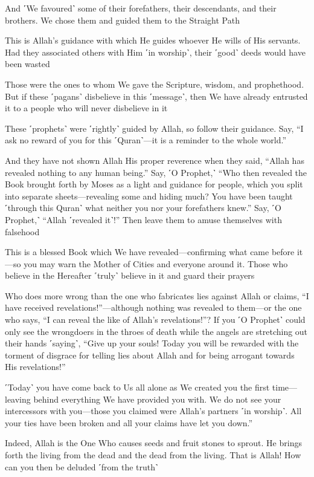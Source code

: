 And ˹We favoured˺ some of their forefathers, their descendants, and their brothers. We chose them and guided them to the Straight Path

This is Allah’s guidance with which He guides whoever He wills of His servants. Had they associated others with Him ˹in worship˺, their ˹good˺ deeds would have been wasted

Those were the ones to whom We gave the Scripture, wisdom, and prophethood. But if these ˹pagans˺ disbelieve in this ˹message˺, then We have already entrusted it to a people who will never disbelieve in it

These ˹prophets˺ were ˹rightly˺ guided by Allah, so follow their guidance. Say, “I ask no reward of you for this ˹Quran˺—it is a reminder to the whole world.”

And they have not shown Allah His proper reverence when they said, “Allah has revealed nothing to any human being.” Say, ˹O Prophet,˺ “Who then revealed the Book brought forth by Moses as a light and guidance for people, which you split into separate sheets—revealing some and hiding much? You have been taught ˹through this Quran˺ what neither you nor your forefathers knew.” Say, ˹O Prophet,˺ “Allah ˹revealed it˺!” Then leave them to amuse themselves with falsehood

This is a blessed Book which We have revealed—confirming what came before it—so you may warn the Mother of Cities and everyone around it. Those who believe in the Hereafter ˹truly˺ believe in it and guard their prayers

Who does more wrong than the one who fabricates lies against Allah or claims, “I have received revelations!”—although nothing was revealed to them—or the one who says, “I can reveal the like of Allah’s revelations!”? If you ˹O Prophet˺ could only see the wrongdoers in the throes of death while the angels are stretching out their hands ˹saying˺, “Give up your souls! Today you will be rewarded with the torment of disgrace for telling lies about Allah and for being arrogant towards His revelations!”

˹Today˺ you have come back to Us all alone as We created you the first time—leaving behind everything We have provided you with. We do not see your intercessors with you—those you claimed were Allah’s partners ˹in worship˺. All your ties have been broken and all your claims have let you down.”

Indeed, Allah is the One Who causes seeds and fruit stones to sprout. He brings forth the living from the dead and the dead from the living. That is Allah! How can you then be deluded ˹from the truth˺

